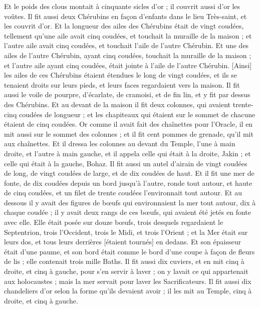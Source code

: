 \begin{multicols}{2}
Et le poids des clous montait à cinquante sicles d'or ; il couvrit aussi d'or les voûtes.
Il fit aussi deux Chérubins en façon d'enfants dans le lieu Très-saint, et les couvrit d'or.
Et la longueur des ailes des Chérubins était de vingt coudées, tellement qu'une aile avait cinq coudées, et touchait la muraille de la maison ; et l'autre aile avait cinq coudées, et touchait l'aile de l'autre Chérubin.
Et une des ailes de l'autre Chérubin, ayant cinq coudées, touchait la muraille de la maison ; et l'autre aile ayant cinq coudées, était jointe à l'aile de l'autre Chérubin.
[Ainsi] les ailes de ces Chérubins étaient étendues le long de vingt coudées, et ils se tenaient droits sur leurs pieds, et leurs faces regardaient vers la maison.
Il fit aussi le voile de pourpre, d'écarlate, de cramoisi, et de fin lin, et y fit par dessus des Chérubins.
Et au devant de la maison il fit deux colonnes, qui avaient trente-cinq coudées de longueur ; et les chapiteaux qui étaient sur le sommet de chacune étaient de cinq coudées.
Or comme il avait fait des chaînettes pour l'Oracle, il en mit aussi sur le sommet des colonnes ; et il fit cent pommes de grenade, qu'il mit aux chaînettes.
Et il dressa les colonnes au devant du Temple, l'une à main droite, et l'autre à main gauche, et il appela celle qui était à la droite, Jakin ; et celle qui était à la gauche, Bohaz.
\VerseOne{}Il fit aussi un autel d'airain de vingt coudées de long, de vingt coudées de large, et de dix coudées de haut.
Et il fit une mer de fonte, de dix coudées depuis un bord jusqu'à l'autre, ronde tout autour, et haute de cinq coudées, et un filet de trente coudées l'environnait tout autour.
Et au dessous il y avait des figures de bœufs qui environnaient la mer tout autour, dix à chaque coudée ; il y avait deux rangs de ces bœufs, qui avaient été jetés en fonte avec elle.
Elle était posée sur douze bœufs, trois desquels regardaient le Septentrion, trois l'Occident, trois le Midi, et trois l'Orient ; et la Mer était sur leurs dos, et tous leurs derrières [étaient tournés] en dedans.
Et son épaisseur était d'une paume, et son bord était comme le bord d'une coupe à façon de fleurs de lis ; elle contenait trois mille Baths.
Il fit aussi dix cuviers, et en mit cinq à droite, et cinq à gauche, pour s'en servir à laver ; on y lavait ce qui appartenait aux holocaustes ; mais la mer servait pour laver les Sacrificateurs.
Il fit aussi dix chandeliers d'or selon la forme qu'ils devaient avoir ; il les mit au Temple, cinq à droite, et cinq à gauche.

\end{multicols}
